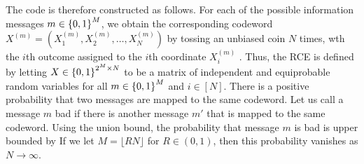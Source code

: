 \documentclass[letterpaper,english,10pt]{article}
\begin{document}
The code is therefore constructed as follows. 
For each of the possible information messages $m \in \left\{0, 1\right\}^M$, 
we obtain the corresponding codeword $X^{(m)} = (X_1^{(m)}, X_2^{(m)}, \dots, X_N^{(m)})$ by tossing an unbiased coin $N$ times, wth the $i$th outcome assigned to the $i$th coordinate $X_i^{(m)}$ .
Thus, the RCE is defined by letting $X \in \left\{0,1\right\}^{2^M \times N}$ to be a matrix of independent and equiprobable random variables for all $m \in \left\{0,1\right\}^M$ and $i \in [N]$.  
There is a positive probability that two messages are mapped to the same codeword. 
Let us call a message $m$ bad if there is another message $m'$ that is mapped to the same codeword. Using the union bound, the probability that message $m$ is
bad is upper bounded by
If we let $M = \lfloor RN\rfloor$ for $R \in (0,1)$, then this probability vanishes as $N \to \infty$.
\end{document}
